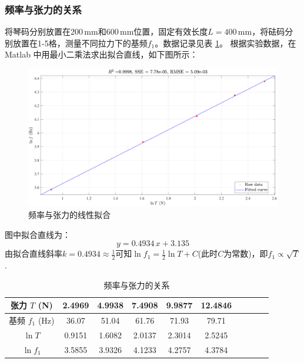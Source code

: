 \documentclass[UTF8]{article}
\theoremstyle{MyLineTheoremStyle} %
\theoremstyle{MyBlockTheoremStyle} %
\theoremstyle{MySubsubsectionStyle} %
\begin{document}

\subsubsection{频率与张力的关系}
将琴码分别放置在200\,mm和600\,mm位置，固定有效长度$ L=400\,\mathrm{mm} $，将砝码分别放置在1-5格，测量不同拉力下的基频$ f_1 $。数据记录见表 \ref{频率与张力的关系}。
根据实验数据，在 Matlab 中用最小二乘法求出拟合直线，如下图所示：
\begin{figure}[H]\centering
    \includegraphics[width=0.9\columnwidth]{assets/4.pdf}
    \caption{频率与张力的线性拟合}
\end{figure}
图中拟合直线为：
\begin{equation}
y = 0.4934 \,x + 3.135
\end{equation}
由拟合直线斜率$ k=0.4934\approx\frac12 $可知$ \ln f_1=\frac 12\ln T+C $(此时$ C $为常数)，即$ f_1\propto\sqrt{T} $.

\begin{table}[H]\centering
    \caption{频率与张力的关系}
    \label{频率与张力的关系}
\begin{tabular}{cccccccccc}\toprule
    张力 $T$ (N)&2.4969&    4.9938&    7.4908&    9.9877&   12.4846\\
    \midrule
    基频 $f_1$ (Hz)&36.07&   51.04&   61.76&   71.93&   79.71\\
    $\ln T$&0.9151&   1.6082&    2.0137&    2.3014&    2.5245\\
    $\ln f_1$&3.5855&   3.9326&    4.1233&    4.2757&    4.3784\\
    \bottomrule
\end{tabular}
\end{table}
\end{document}
